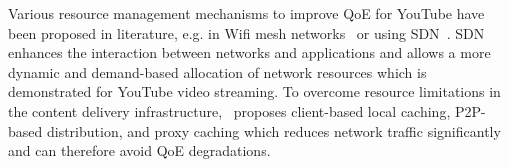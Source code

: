 Various resource management mechanisms to improve \gls{QoE} for YouTube have been proposed in literature, e.g. in Wifi mesh networks~\cite{Wamser2013} or using \gls{SDN}~\cite{Zinner2014}.
\gls{SDN} enhances the interaction between networks and applications and allows a more dynamic and demand-based allocation of network resources which is demonstrated for YouTube video streaming.
To overcome resource limitations in the content delivery infrastructure,~\cite{Zink2008} proposes client-based local caching, \gls{P2P}-based distribution, and proxy caching which reduces network traffic significantly and can therefore avoid \gls{QoE} degradations.